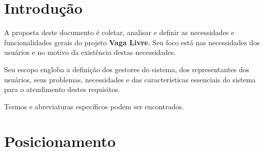 \documentclass[a4paper,12pt]{article}
\begin{document}



\vfill
\pagebreak
\tableofcontents{}
\pagebreak


\section{Introdução}

A proposta deste documento é coletar, analisar e definir as necessidades e funcionalidades gerais do projeto \textbf{Vaga Livre}. Seu foco está nas necessidades dos usuários e no motivo da existência destas necessidades.

Seu escopo engloba a definição dos gestores do sistema, dos representantes dos usuários, seus problemas, necessidades e das características essenciais do sistema para o atendimento destes requisitos.

Termos e abreviaturas específicos podem ser encontrados.

\section{Posicionamento}
\end{document}
